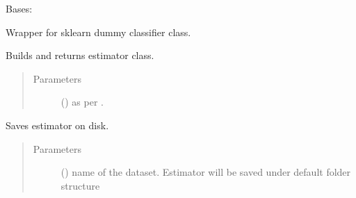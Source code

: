 \documentclass[letterpaper,10pt,english]{sphinxmanual}
\begin{document}
\begin{fulllineitems}
\label{\detokenize{estimators:mleap.estimators.baseline_estimators.Baseline_Classifier}}
Bases: {\hyperref[\detokenize{estimators:mleap.estimators.mleap_estimator.MleapEstimator}]{}}

Wrapper for sklearn dummy classifier class.

\begin{fulllineitems}
\label{\detokenize{estimators:mleap.estimators.baseline_estimators.Baseline_Classifier.build}}
Builds and returns estimator class.
\begin{quote}\begin{description}
\item[{Parameters}] \leavevmode
{} () \textendash{} as per .

\end{description}\end{quote}

\end{fulllineitems}


\begin{fulllineitems}
\label{\detokenize{estimators:mleap.estimators.baseline_estimators.Baseline_Classifier.save}}
Saves estimator on disk.
\begin{quote}\begin{description}
\item[{Parameters}] \leavevmode
{} () \textendash{} name of the dataset. Estimator will be saved under default folder structure 

\end{description}\end{quote}

\end{fulllineitems}


\end{fulllineitems}
\end{document}
